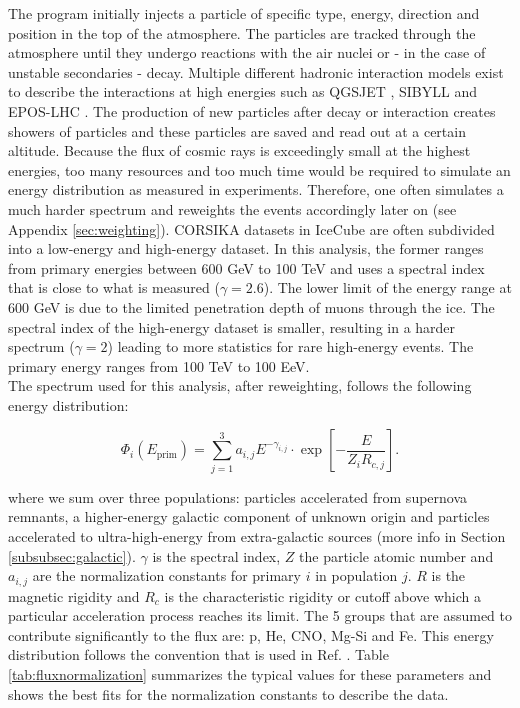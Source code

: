 \noindent The program initially injects a particle of specific type, energy, direction and position in the top of the atmosphere. The particles are tracked through the atmosphere until they undergo reactions with the air nuclei or - in the case of unstable secondaries - decay. Multiple different hadronic interaction models exist to describe the interactions at high energies such as QGSJET \cite{Ostapchenko:2010vb}, SIBYLL \cite{Riehn:2017mfm} and EPOS-LHC \cite{Pierog:2013ria}. The production of new particles after decay or interaction creates showers of particles and these particles are saved and read out at a certain altitude. Because the flux of cosmic rays is exceedingly small at the highest energies, too many resources and too much time would be required to simulate an energy distribution as measured in experiments. Therefore, one often simulates a much harder spectrum and reweights the events accordingly later on (see Appendix \ref{sec:weighting}). CORSIKA datasets in IceCube are often subdivided into a low-energy and high-energy dataset. In this analysis, the former ranges from primary energies between 600 GeV to 100 TeV and uses a spectral index that is close to what is measured ($\gamma = 2.6$). The lower limit of the energy range at 600 GeV is due to the limited penetration depth of muons through the ice. The spectral index of the high-energy dataset is smaller, resulting in a harder spectrum ($\gamma = 2$) leading to more statistics for rare high-energy events. The primary energy ranges from 100 TeV to 100 EeV.\\

\noindent The spectrum used for this analysis, after reweighting, follows the following energy distribution:

\begin{equation}
\label{eq:gaisser}
\Phi_i \left(E_{\textrm{prim}}\right) = \sum^3_{j=1} a_{i,j} E^{-\gamma_{i,j}} \cdot \exp \left[- \frac{E}{Z_i R_{c,j}}\right].
\end{equation}

\noindent where we sum over three populations: particles accelerated from supernova remnants, a higher-energy galactic component of unknown origin and particles accelerated to ultra-high-energy from extra-galactic sources (more info in Section \ref{subsubsec:galactic}). $\gamma$ is the spectral index, $Z$ the particle atomic number and $a_{i,j}$ are the normalization constants for primary $i$ in population $j$. $R$ is the magnetic rigidity and $R_c$ is the characteristic rigidity or cutoff above which a particular acceleration process reaches its limit. The 5 groups that are assumed to contribute significantly to the flux are: p, He, CNO, Mg-Si and Fe. This energy distribution follows the convention that is used in Ref. \cite{Gaisser:2013bla}. Table \ref{tab:fluxnormalization} summarizes the typical values for these parameters and shows the best fits for the normalization constants to describe the data.

